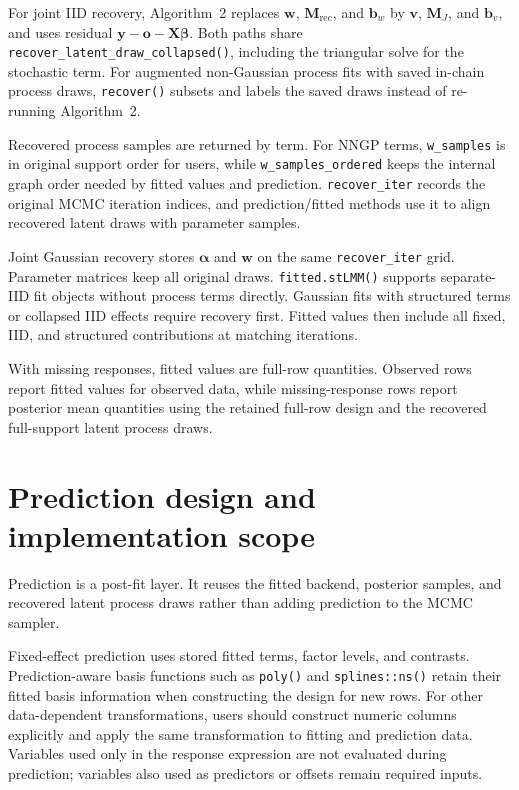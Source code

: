 \documentclass[11pt]{article}
\newcommand{\by}{\bm{y}}
\newcommand{\bw}{\bm{w}}
\newcommand{\balpha}{\bm{\alpha}}
\newcommand{\bbeta}{\bm{\beta}}
\newcommand{\bv}{\bm{v}}
\newcommand{\bb}{\bm{b}}
\newcommand{\bo}{\bm{o}}
\newcommand{\bM}{\bm{M}}
\newcommand{\bX}{\bm{X}}
\begin{document}
For joint IID recovery, Algorithm~2 replaces $\bw$, $\bM_{\mathrm{rec}}$, and
$\bb_w$ by $\bv$, $\bM_J$, and $\bb_v$, and uses residual $\by-\bo-\bX\bbeta$.
Both paths share \texttt{recover\_latent\_draw\_collapsed()}, including the
triangular solve for the stochastic term. For augmented non-Gaussian process
fits with saved in-chain process draws, \texttt{recover()} subsets and labels
the saved draws instead of re-running Algorithm~2.

Recovered process samples are returned by term. For NNGP terms, \texttt{w\_samples} is in original support order for users, while \texttt{w\_samples\_ordered} keeps the internal graph order needed by fitted values and prediction. \texttt{recover\_iter} records the original MCMC iteration indices, and prediction/fitted methods use it to align recovered latent draws with parameter samples.

Joint Gaussian recovery stores $\balpha$ and $\bw$ on the same
\texttt{recover\_iter} grid. Parameter matrices keep all original draws.
\texttt{fitted.stLMM()} supports separate-IID fit objects without process terms
directly. Gaussian fits with structured terms or collapsed IID effects require
recovery first. Fitted values then include all fixed, IID, and structured
contributions at matching iterations.

With missing responses, fitted values are full-row quantities. Observed rows report fitted values for observed data, while missing-response rows report posterior mean quantities using the retained full-row design and the recovered full-support latent process draws.

\section{Prediction design and implementation scope}

Prediction is a post-fit layer. It reuses the fitted backend, posterior samples, and recovered latent process draws rather than adding prediction to the MCMC sampler.

Fixed-effect prediction uses stored fitted terms, factor levels, and contrasts. Prediction-aware basis functions such as \texttt{poly()} and \texttt{splines::ns()} retain their fitted basis information when constructing the design for new rows. For other data-dependent transformations, users should construct numeric columns explicitly and apply the same transformation to fitting and prediction data. Variables used only in the response expression are not evaluated during prediction; variables also used as predictors or offsets remain required inputs.
\end{document}
